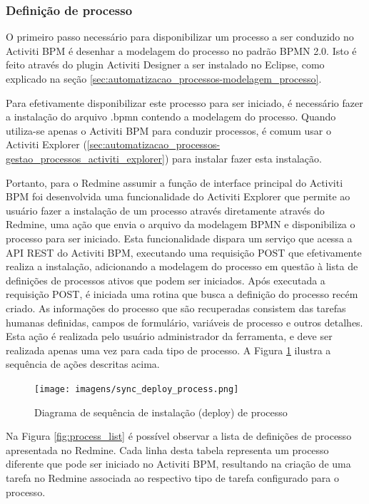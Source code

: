 \subsubsection{Definição de processo}\label{sec:integracao_redmine_activiti_sincronizacao-deploy_processo}

O primeiro passo necessário para disponibilizar um processo a ser conduzido no Activiti BPM é desenhar a modelagem do processo no padrão BPMN 2.0. Isto é feito através do plugin Activiti Designer a ser instalado no Eclipse, como explicado na seção \ref{sec:automatizacao_processos-modelagem_processo}.

Para efetivamente disponibilizar este processo para ser iniciado, é necessário fazer a instalação do arquivo .bpmn contendo a modelagem do processo. 
Quando utiliza-se apenas o Activiti BPM para conduzir processos, é comum usar o Activiti Explorer (\ref{sec:automatizacao_processos-gestao_processos_activiti_explorer}) para instalar fazer esta instalação. 

Portanto, para o Redmine assumir a função de interface principal do Activiti BPM foi desenvolvida uma funcionalidade do Activiti Explorer que permite ao usuário fazer a instalação de um processo através diretamente através do Redmine, uma ação que envia o arquivo da modelagem BPMN e disponibiliza o processo para ser iniciado. Esta funcionalidade dispara um serviço que acessa a API REST do Activiti BPM, executando uma requisição POST que efetivamente realiza a instalação, adicionando a modelagem do processo em questão à lista de definições de processos ativos que podem ser iniciados. 
Após executada a requisição POST, é iniciada uma rotina que busca a definição do processo recém criado. As informações do processo que são recuperadas consistem das tarefas humanas definidas, campos de formulário, variáveis de processo e outros detalhes. Esta ação é realizada pelo usuário administrador da ferramenta, e deve ser realizada apenas uma vez para cada tipo de processo.
A Figura \ref{fig:sync_deploy_process} ilustra a sequência de ações descritas acima.

\begin{figure}[H]
\centering
\texttt{[image: imagens/sync\_deploy\_process.png]}
\caption{Diagrama de sequência de instalação (deploy) de processo}
\label{fig:sync_deploy_process}
\end{figure}

Na Figura \ref{fig:process_list} é possível observar a lista de definições de processo apresentada no Redmine. Cada linha desta tabela representa um processo diferente que pode ser iniciado no Activiti BPM, resultando na criação de uma tarefa no Redmine associada ao respectivo tipo de tarefa configurado para o processo.

